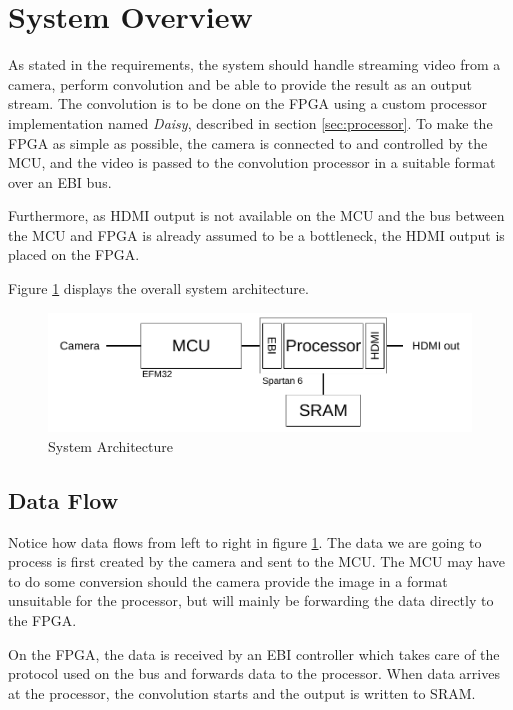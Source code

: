 \section{System Overview}
As stated in the requirements, the system should handle streaming video from a camera, perform convolution and be able to provide the result as an output stream.
The convolution is to be done on the FPGA using a custom processor implementation named \textit{Daisy}, described in section \ref{sec:processor}.
To make the FPGA as simple as possible, the camera is connected to and controlled by the MCU, and the video is passed to the convolution processor in a suitable format over an EBI bus.

Furthermore, as HDMI output is not available on the MCU and the bus between the MCU and FPGA is already assumed to be a bottleneck, the HDMI output is placed on the FPGA.

Figure \ref{fig:systemArchitecture} displays the overall system architecture.

\begin{figure}
    \includegraphics{img/SystemArchitecture.pdf}
    \caption{System Architecture}
    \label{fig:systemArchitecture}
\end{figure}



\subsection{Data Flow}
Notice how data flows from left to right in figure \ref{fig:systemArchitecture}.
The data we are going to process is first created by the camera and sent to the MCU.
The MCU may have to do some conversion should the camera provide the image in a format unsuitable for the processor, but will mainly be forwarding the data directly to the FPGA.

On the FPGA, the data is received by an EBI controller which takes care of the protocol used on the bus and forwards data to the processor.
When data arrives at the processor, the convolution starts and the output is written to SRAM.

